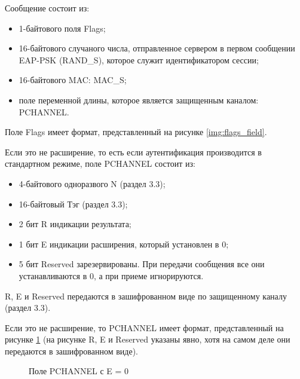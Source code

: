 Сообщение состоит из:

\begin{itemize}
\item 1-байтового поля Flags;
\item 16-байтового случаного числа, отправленное сервером в первом сообщении EAP-PSK (RAND\_S), которое служит идентификатором сессии;
\item 16-байтового MAC: MAC\_S;
\item поле переменной длины, которое является защищенным каналом: PCHANNEL.
\end{itemize}

Поле Flags имеет формат, представленный на рисунке \ref{img:flags_field}.

Если это не расширение, то есть если аутентификация производится в стандартном режиме, поле PCHANNEL состоит из:

\begin{itemize}
\item 4-байтового одноразвого N (раздел 3.3);
\item 16-байтовый Тэг (раздел 3.3);
\item 2 бит R индикации результата;
\item 1 бит E индикации расширения, который установлен в 0;
\item 5 бит Reserved зарезервированы. При передачи сообщения все они устанавливаются в 0, а при приеме игнорируются.
\end{itemize}

R, E и Reserved передаются в зашифрованном виде по защищенному каналу (раздел 3.3).

Если это не расширение, то PCHANNEL имеет формат, представленный на рисунке \ref{img:simple_pchannel} (на рисунке R, E и Reserved указаны явно, хотя на самом деле они передаются в зашифрованном виде).

\begin{figure}[h!]
\caption{Поле PCHANNEL с E = 0}
\label{img:simple_pchannel}
\end{figure}

